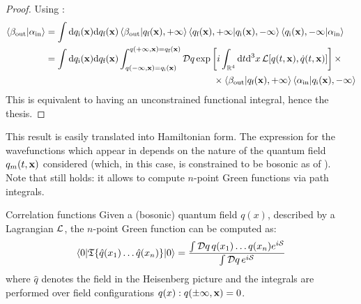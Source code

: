 \begin{proofbox}
  \begin{proof}
    Using :
    \begin{equation*}
      \begin{split}
        \braket{\beta_\text{out} | \alpha_\text{in}}
        & = \int \mathrm{d} q_\text{i}(\mathbf{x}) \mathrm{d} q_\text{f}(\mathbf{x}) \braket{\beta_\text{out} | q_\text{f}(\mathbf{x}), +\infty} \braket{q_\text{f}(\mathbf{x}),+\infty | q_\text{i}(\mathbf{x}),-\infty} \braket{q_\text{i}(\mathbf{x}), -\infty | \alpha_\text{in}} \\
        & = \int \mathrm{d} q_\text{i}(\mathbf{x}) \mathrm{d} q_\text{f}(\mathbf{x}) \int_{q(-\infty,\mathbf{x}) = q_\text{i}(\mathbf{x})}^{q(+\infty,\mathbf{x}) = q_\text{f}(\mathbf{x})} \mathcal{D}q \exp \left[ i \int_{\mathbb{R}^4} \mathrm{d} t \mathrm{d}^3 x\, \mathcal{L}[q(t,\mathbf{x}),\dot{q}(t,\mathbf{x})] \right] \times \\
        & \qquad \qquad \qquad \qquad \qquad \qquad \qquad \qquad \qquad \times \braket{\beta_\text{out} | q_\text{f}(\mathbf{x}), +\infty} \braket{\alpha_\text{in} | q_\text{i}(\mathbf{x}), -\infty}
      \end{split}
    \end{equation*}
    This is equivalent to having an unconstrained functional integral, hence the thesis.
  \end{proof}
\end{proofbox}

This result is easily translated into Hamiltonian form. The expression for the wavefunctions which appear in  depends on the nature of the quantum field $ q_m(t,\mathbf{x}) $ considered (which, in this case, is constrained to be bosonic as of ). \\
Note that  still holds: it allows to compute $ n $-point Green functions via path integrals.

\begin{proposition}{Correlation functions}{}
  Given a (bosonic) quantum field $ q(x) $, described by a Lagrangian $ \mathcal{L} $, the $ n $-point Green function can be computed as:
  \begin{equation}
    \braket{0 | \mathfrak{T}\{\hat{q}(x_1) \dots \hat{q}(x_n)\} | 0} = \frac{\int \mathcal{D}q\, q(x_1) \dots q(x_n) e^{i \mathcal{S}}}{\int \mathcal{D}q\, e^{i \mathcal{S}}}
    \label{eq:corr-func-path}
  \end{equation}
  where $ \hat{q} $ denotes the field in the Heisenberg picture and the integrals are performed over field configurations $ q(x) : q(\pm \infty, \mathbf{x}) = 0 $.
\end{proposition}

